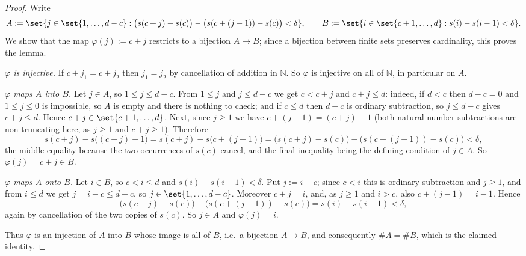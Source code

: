 \begin{proof}
  Write
  \[
    A := \set{j \in \set{1,\dots,d-c} : \bigl(s(c+j)-s(c)\bigr) - \bigl(s(c+(j-1))-s(c)\bigr) <
    \delta}, \qquad
    B := \set{i \in \set{c+1,\dots,d} : s(i)-s(i-1) < \delta}
    .
  \]
  We show that the map $\varphi(j) := c+j$ restricts to a bijection $A \to B$; since a bijection
  between finite sets preserves cardinality, this proves the lemma.

  \emph{$\varphi$ is injective.} If $c+j_1 = c+j_2$ then $j_1 = j_2$ by cancellation of addition in
  $\mathbb{N}$. So $\varphi$ is injective on all of $\mathbb{N}$, in particular on $A$.

  \emph{$\varphi$ maps $A$ into $B$.} Let $j \in A$, so $1 \le j \le d-c$. From $1 \le j$ and $j \le
  d-c$ we get $c < c+j$ and $c+j \le d$: indeed, if $d < c$ then $d-c = 0$ and $1 \le j \le 0$ is
  impossible, so $A$ is empty and there is nothing to check; and if $c \le d$ then $d-c$ is ordinary
  subtraction, so $j \le d-c$ gives $c+j \le d$. Hence $c+j \in \set{c+1,\dots,d}$. Next, since
  $j \ge 1$ we have $c + (j-1) = (c+j)-1$ (both natural-number subtractions are non-truncating
  here, as $j \ge 1$ and $c+j \ge 1$). Therefore
  \[
    s(c+j) - s\bigl((c+j)-1\bigr) = s(c+j) - s\bigl(c+(j-1)\bigr)
    = \bigl(s(c+j)-s(c)\bigr) - \bigl(s(c+(j-1))-s(c)\bigr) < \delta
    ,
  \]
  the middle equality because the two occurrences of $s(c)$ cancel, and the final inequality being
  the defining condition of $j \in A$. So $\varphi(j) = c+j \in B$.

  \emph{$\varphi$ maps $A$ onto $B$.} Let $i \in B$, so $c < i \le d$ and $s(i)-s(i-1) < \delta$.
  Put $j := i-c$; since $c < i$ this is ordinary subtraction and $j \ge 1$, and from $i \le d$ we
  get $j = i-c \le d-c$, so $j \in \set{1,\dots,d-c}$. Moreover $c+j = i$, and, as $j \ge 1$ and
  $i > c$, also $c+(j-1) = i-1$. Hence
  \[
    \bigl(s(c+j)-s(c)\bigr) - \bigl(s(c+(j-1))-s(c)\bigr) = s(i)-s(i-1) < \delta
    ,
  \]
  again by cancellation of the two copies of $s(c)$. So $j \in A$ and $\varphi(j) = i$.

  Thus $\varphi$ is an injection of $A$ into $B$ whose image is all of $B$, i.e.\ a bijection
  $A \to B$, and consequently $\#A = \#B$, which is the claimed identity.
\end{proof}
